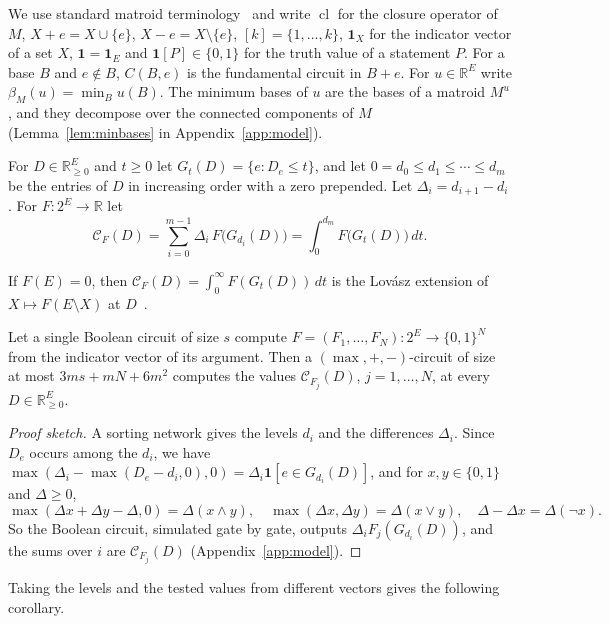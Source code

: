 \documentclass[runningheads,envcountsame]{llncs}
\newcommand{\R}{\mathbb R}
\newcommand{\cl}{\operatorname{cl}}
\newcommand{\CC}{\mathcal C}
\begin{document}
We use standard matroid terminology~\cite{oxley11,schrijver03} and write
$\cl$ for the closure operator of $M$, $X+e=X\cup\{e\}$, $X-e=X\setminus\{e\}$, $[k]=\{1,\ldots,k\}$, $\mathbf 1_X$ for the indicator vector of
a set $X$, $\mathbf 1=\mathbf 1_E$ and $\mathbf 1[P]\in\{0,1\}$ for the truth value of a
statement $P$.  For a base $B$
and $e\notin B$, $C(B,e)$ is the fundamental circuit in $B+e$.  For $u\in\R^{E}$
write $\beta_M(u)=\min_Bu(B)$.  The minimum bases of
$u$ are the bases of a matroid $M^{u}$, and they decompose over the connected
components of $M$ (Lemma~\ref{lem:minbases} in Appendix~\ref{app:model}).

\begin{definition}
\label{def:ti}
For $D\in\R^{E}_{\ge0}$ and $t\ge0$ let $G_t(D)=\{e:D_e\le t\}$, and let
$0=d_0\le d_1\le\cdots\le d_m$ be the entries of $D$ in increasing order with a
zero prepended.  Let $\Delta_i=d_{i+1}-d_i$.  For
$F:2^{E}\to\R$ let
\[
  \CC_F(D)=\sum_{i=0}^{m-1}\Delta_i\,F\bigl(G_{d_i}(D)\bigr)
  =\int_0^{d_m}F\bigl(G_t(D)\bigr)\,dt.
\]
\end{definition}

If $F(E)=0$, then $\CC_F(D)=\int_0^{\infty}F(G_t(D))\,dt$ is the Lov\'asz
extension of $X\mapsto F(E\setminus X)$ at $D$~\cite{lovasz83}.

\begin{theorem}
\label{thm:compiler}
Let a single Boolean circuit of size $s$ compute $F=(F_1,\ldots,F_N):2^{E}\to\{0,1\}^{N}$
from the indicator vector of its argument.  Then a $(\max,+,-)$-circuit of
size at most $3ms+mN+6m^{2}$ computes the values $\CC_{F_j}(D)$,
$j=1,\ldots,N$, at every $D\in\R^{E}_{\ge0}$.
\end{theorem}

\begin{proof}[Proof sketch]
A sorting network gives the levels $d_i$ and the differences $\Delta_i$.  Since $D_e$ occurs among
the $d_i$, we have $\max(\Delta_i-\max(D_e-d_i,0),0)=\Delta_i\mathbf 1[e\in G_{d_i}(D)]$,
and for $x,y\in\{0,1\}$ and $\Delta\ge0$,
\[
  \max(\Delta x+\Delta y-\Delta,0)=\Delta(x\wedge y),\quad
  \max(\Delta x,\Delta y)=\Delta(x\vee y),\quad
  \Delta-\Delta x=\Delta(\neg x).
\]
So the Boolean circuit, simulated gate by gate, outputs $\Delta_iF_j(G_{d_i}(D))$,
and the sums over $i$ are $\CC_{F_j}(D)$ (Appendix~\ref{app:model}).
\end{proof}

Taking the levels and the tested values from different vectors gives the
following corollary.
\end{document}
